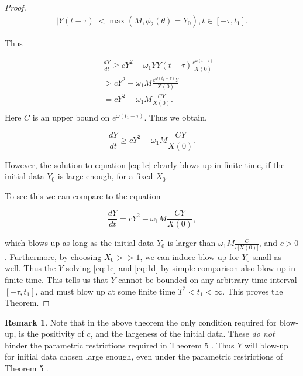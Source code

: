 \documentclass[10pt]{amsart}
\theoremstyle{definition}
\newtheorem{remark}{Remark}
\begin{document}
\begin{proof}
\begin{eqnarray}
 |Y(t-\tau)| < \max(M,\phi_{2}(\theta)=Y_{0}), t \in [-\tau, t_{1}].
\end{eqnarray}

Thus

\begin{eqnarray}
&&\frac{dY}{dt} \geq cY^2 - \omega_{1}Y Y(t-\tau)\frac{e^{\omega(t-\tau)}}{X(0)}  \nonumber \\
&& >  cY^2  - \omega_{1}M\frac{e^{\omega(t_{1}-\tau)}Y}{X(0)}  \nonumber \\
&& =  cY^2  - \omega_{1}M\frac{CY}{X(0)}.  \nonumber \\
\end{eqnarray}
Here $C$ is an upper bound on $e^{\omega(t_{1}-\tau)}$. Thus we obtain,

\begin{equation}
\label{eq:1c}
\frac{dY}{dt} \geq cY^2  - \omega_{1}M\frac{C Y}{X(0)}. 
\end{equation}

However, the solution to equation \eqref{eq:1c} clearly blows up in finite time, if the initial data $Y_{0}$ is large enough, for a fixed $X_{0}$. 

To see this we can compare to the equation 

\begin{equation}
\label{eq:1b}
\frac{dY}{dt} =   cY^2  - \omega_{1}M\frac{C Y}{X(0)},
\end{equation}

which blows up as long as the initial data $Y_0$ is larger than $\omega_{1}M\frac{C}{c |X(0)|}$, and $c>0$.
 Furthermore, by choosing $X_{0} >>1$, we can induce blow-up for $Y_{0}$ small as well.
Thus the $Y$ solving \eqref{eq:1c} and \eqref{eq:1d} by simple comparison also blow-up in finite time.
This tells us that $Y$ cannot be bounded on any arbitrary time interval $[-\tau,t_{1}]$, and must blow up at some finite time $T^{*} <t_{1} <\infty$.
 This proves the Theorem.
\end{proof}

\begin{remark}
Note that in the above theorem the only condition required for blow-up, is the positivity of $c$, and the largeness of the initial data. These \emph{do not} hinder the parametric restrictions required in Theorem 5 \cite{RK15}. Thus $Y$ will blow-up for initial data chosen large enough, even under the parametric restrictions of Theorem 5 \cite{RK15}.
\end{remark}
\end{document}
